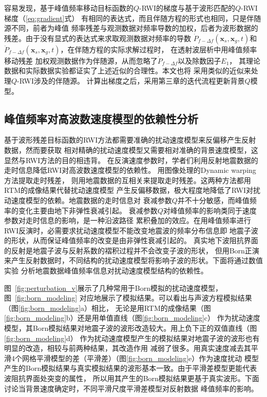 容易发现，基于峰值频率移动目标函数的$Q$-RWI的梯度与基于波形匹配的$Q$-RWI梯度（\ref{eq:gradient}式）
有相同的表达式，而且伴随方程的形式也相同，只是伴随源不同，前者为峰值
频率残差与观测数据对频率导数的加权，后者为波形数据的残差。由于没有显式的表达式来求取观测数据对频率的导数
$\dot{P}_{f-\Delta f}(\mathbf{x}_s,\mathbf{x}_g,t)$和$\ddot{P}_{f-\Delta f}(\mathbf{x}_s,
\mathbf{x}_g,t)$，在伴随方程的实际求解过程时，
在透射波层析中用峰值频率移动残差
加权观测数据作为伴随源，从而忽略了$\dot{P}_{f-\Delta f}$以及除数因子$E_1$，
其理论数据和实际数据实验都证实了上述近似的合理性。本文也将
采用类似的近似来处理$Q$-RWI涉及的伴随源。
计算出梯度之后，采用第三章的迭代流程更新背景$Q$模型。

\vspace{1.0cm}
\subsection{峰值频率对高波数速度模型的依赖性分析}
\vspace{0.7cm}

基于波形残差目标函数的RWI方法都需要准确的扰动速度模型来反偏移产生反射数据，然而要获取
相对精确的扰动速度模型又需要相对准确的背景速度模型，这显然与RWI方法的目的相违背。
在反演速度参数时，学者们利用反射地震数据的走时信息降低RWI对高波数速度模型的依赖性。
用图像处理的Dynamic warping方法提取走时残差，
则用地震数据的互相关来提取走时残差。这两种方法都用RTM的成像结果代替扰动速度模型
产生反偏移数据，极大程度地降低了RWI对扰动速度模型的依赖。地震数据的走时信息对
衰减参数$Q$并不十分敏感，而峰值频率的变化主要由地下非弹性衰减引起。
衰减参数$Q$对峰值频率的影响类同于速度参数对走时信息的影响，是一种沿波路径
累积叠加的效应。在用峰值频率进行RWI反演时，必需要求扰动速度模型不能改变地震波的频率分布信息即
地震子波的形状，从而保证峰值频率的改变是由非弹性衰减引起的。
真实地下波阻抗界面的反射是地震子波与反射系数的褶积过程并不会改变子波的形状，
但用Born正演来产生反射数据时，不同结构的扰动速度模型将影响子波的形状。下面将通过数值实验
分析地震数据峰值频率信息对扰动速度模型结构的依赖性。

图~\ref{fig:perturbation_v}展示了几种常用于Born模拟的扰动速度模型，图~\ref{fig:born_modeling}
对应地展示了模拟结果。可以看出与声波方程模拟结果（图\ref{fig:born_modeling}a）相比，
无论是用RTM的成像结果（图\ref{fig:born_modeling}b）还是用单值直线（图\ref{fig:born_modeling}c）
作为扰动速度模型，其Born模拟结果对地震子波的波形改造较大。用上负下正的双值直线（图\ref{fig:born_modeling}d）
作为扰动速度模型产生的模拟结果对地震子波的波形也有明显的改造，相较与前两种结果，其改造作用
减弱了很多。用真实速度减去其平滑4个网格平滑模型的差（平滑差）（图\ref{fig:born_modeling}e）作为速度扰动
模型产生的Born模拟结果与真实模拟结果的波形基本一致。由于平滑差模型更能代表波阻抗界面处突变的属性，
所以用其产生的Born模拟结果更基于真实波形。下面讨论当背景速度确定时，不同平滑尺度平滑差模型对反射数据
峰值频率的影响。

